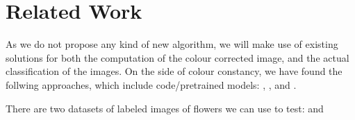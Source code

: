 \section{Related Work}

As we do not propose any kind of new algorithm, we will make use of existing solutions for both
the computation of the colour corrected image, and the actual classification of the images.
On the side of colour constancy, we have found the follwing approaches, which include code/pretrained models:
\cite{hu2017fc}, \cite{afifi2018}, \cite{afifi2021} and \cite{Lo_2021_CVPR}.

There are two datasets of labeled images of flowers we can use to test: \cite{Nilsback06} and \cite{Nilsback08}

